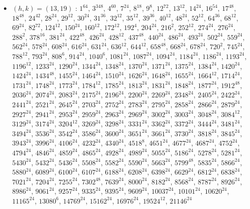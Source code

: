 \begin{itemize}
\item $(h,k)=(13,19)$ : $1^{64}$, $3^{348}$, $4^{60}$, $7^{24}$, $8^{18}$, $9^{8}$, $12^{72}$, $13^{12}$, $14^{24}$, $16^{54}$, $17^{48}$, $18^{48}$, $24^{42}$, $28^{24}$, $29^{12}$, $30^{24}$, $31^{36}$, $32^{12}$, $35^{12}$, $39^{36}$, $40^{12}$, $48^{24}$, $52^{12}$, $64^{36}$, $68^{12}$, $69^{24}$, $82^{72}$, $124^{12}$, $150^{24}$, $160^{12}$, $172^{12}$, $192^{4}$, $204^{24}$, $216^{2}$, $252^{12}$, $274^{24}$, $276^{24}$, $288^{2}$, $378^{16}$, $381^{24}$, $422^{48}$, $426^{24}$, $428^{12}$, $437^{48}$, $440^{24}$, $486^{24}$, $493^{24}$, $502^{24}$, $559^{24}$, $562^{24}$, $578^{24}$, $608^{24}$, $616^{24}$, $631^{24}$, $636^{12}$, $644^{12}$, $658^{48}$, $668^{24}$, $678^{24}$, $720^{2}$, $745^{24}$, $788^{12}$, $793^{24}$, $808^{6}$, $914^{24}$, $1040^{6}$, $1081^{24}$, $1087^{24}$, $1094^{24}$, $1184^{24}$, $1186^{24}$, $1193^{24}$, $1196^{12}$, $1233^{24}$, $1290^{24}$, $1344^{24}$, $1348^{24}$, $1370^{24}$, $1371^{24}$, $1375^{24}$, $1384^{24}$, $1420^{24}$, $1424^{24}$, $1434^{48}$, $1455^{24}$, $1464^{24}$, $1510^{24}$, $1626^{24}$, $1648^{24}$, $1655^{24}$, $1664^{12}$, $1714^{24}$, $1731^{24}$, $1748^{24}$, $1773^{24}$, $1784^{12}$, $1785^{24}$, $1813^{24}$, $1831^{24}$, $1848^{24}$, $1877^{24}$, $1912^{48}$, $2036^{24}$, $2074^{24}$, $2083^{24}$, $2175^{24}$, $2196^{24}$, $2200^{24}$, $2269^{24}$, $2348^{24}$, $2405^{24}$, $2422^{24}$, $2441^{24}$, $2521^{24}$, $2645^{24}$, $2703^{24}$, $2752^{24}$, $2783^{24}$, $2795^{24}$, $2858^{24}$, $2866^{24}$, $2879^{24}$, $2927^{24}$, $2941^{24}$, $2953^{24}$, $2959^{24}$, $2963^{24}$, $2969^{24}$, $3002^{24}$, $3003^{24}$, $3048^{24}$, $3084^{12}$, $3129^{24}$, $3174^{24}$, $3204^{12}$, $3269^{24}$, $3298^{24}$, $3331^{24}$, $3362^{24}$, $3372^{24}$, $3444^{24}$, $3481^{24}$, $3494^{24}$, $3536^{24}$, $3542^{24}$, $3586^{24}$, $3600^{24}$, $3651^{24}$, $3661^{24}$, $3730^{24}$, $3818^{24}$, $3845^{24}$, $3943^{24}$, $3996^{24}$, $4106^{24}$, $4232^{24}$, $4340^{24}$, $4518^{8}$, $4651^{24}$, $4677^{24}$, $4687^{24}$, $4752^{24}$, $4794^{24}$, $4846^{24}$, $4859^{24}$, $4865^{24}$, $4928^{24}$, $4989^{24}$, $5055^{24}$, $5186^{24}$, $5278^{24}$, $5281^{24}$, $5430^{24}$, $5432^{24}$, $5436^{24}$, $5508^{24}$, $5582^{24}$, $5590^{24}$, $5663^{24}$, $5799^{48}$, $5835^{24}$, $5866^{24}$, $5880^{24}$, $6089^{24}$, $6100^{24}$, $6107^{24}$, $6188^{24}$, $6208^{24}$, $6398^{24}$, $6629^{24}$, $6812^{24}$, $6838^{24}$, $7021^{24}$, $7204^{24}$, $7255^{24}$, $7302^{48}$, $7639^{24}$, $8000^{24}$, $8182^{24}$, $8568^{24}$, $8787^{24}$, $8926^{24}$, $8986^{24}$, $9061^{24}$, $9257^{24}$, $9335^{24}$, $9395^{24}$, $9609^{24}$, $10037^{24}$, $10101^{24}$, $10620^{24}$, $11165^{24}$, $13080^{6}$, $14769^{24}$, $15162^{24}$, $16976^{24}$, $19524^{12}$, $21146^{24}$

\end{itemize}
